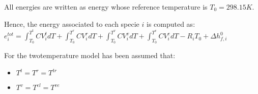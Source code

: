 \documentclass[letterpaper,10pt,english]{jupyterBook}
\begin{document}
\sphinxAtStartPar
All energies are written as energy whose reference temperature is \(T_0 = 298.15 K\). 

\sphinxAtStartPar
Hence, the energy associated to each specie \(i\) is computed as:
\(
e^{tot}_i = \int_{T_0}^{T^t}CV^{t}_i dT + \int_{T_0}^{T^r}CV^{r}_i dT + \int_{T_0}^{T^v}CV^{v}_i dT + \int_{T_0}^{T^e}CV^{e}_i dT - R_i T_0 + \Delta h^0_{f,i}
\)

\sphinxAtStartPar
For the two\sphinxhyphen{}temperature model has been assumed that:
\begin{itemize}
\item {} 
\sphinxAtStartPar
\(T^t = T^r = T^{tr} \)

\item {} 
\sphinxAtStartPar
\(T^v = T^{el} = T^{ve} \)

\end{itemize}
\end{document}
